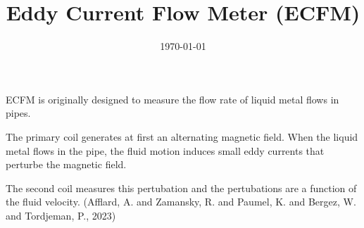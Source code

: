 \documentclass[11pt]{article}
\date{\today}
\title{Eddy Current Flow Meter (ECFM)}
\begin{document}
\maketitle
\tableofcontents

ECFM is originally designed to measure the flow rate of liquid metal flows in pipes.

The primary coil generates at first an alternating magnetic field. When the liquid metal flows in the pipe, the fluid motion induces small eddy currents that perturbe the magnetic field.

The second coil measures this pertubation and the pertubations are a function of the fluid velocity. (Afflard, A. and Zamansky, R. and Paumel, K. and Bergez, W. and Tordjeman, P., 2023) 
\end{document}
